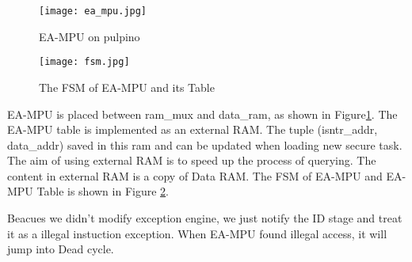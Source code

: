 \documentclass[a4paper]{article}
\begin{document}
\begin{figure}
	\centering
	\texttt{[image: ea\_mpu.jpg]}
	\caption{EA-MPU on pulpino}
	\label{fig:ea_mpu}
\end{figure}

\begin{figure}
	\centering
	\texttt{[image: fsm.jpg]}
	\caption{The FSM of EA-MPU and its Table}
	\label{fig:ea_mpu_fsm}
\end{figure}


EA-MPU is placed between ram\_mux and data\_ram, as shown in Figure\ref{fig:ea_mpu}. The EA-MPU table is implemented as an external RAM. The tuple (isntr\_addr, data\_addr) saved in this ram and can be updated when loading new secure task. The aim of using external RAM is to speed up the process of querying. The content in external RAM is a copy of Data RAM. The FSM of EA-MPU and EA-MPU Table is shown in Figure \ref{fig:ea_mpu_fsm}. 

Beacues we didn't modify exception engine, we just notify the ID stage and treat it as a illegal instuction exception. When EA-MPU found illegal access, it will jump into Dead cycle.  
\end{document}
